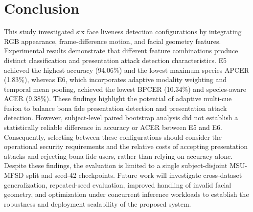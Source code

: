 \documentclass[a4paper,conference]{IEEEtran}
\begin{document}
\section{Conclusion}
This study investigated six face liveness detection configurations by integrating RGB appearance, frame-difference motion, and facial geometry features. Experimental results demonstrate that different feature combinations produce distinct classification and presentation attack detection characteristics. E5 achieved the highest accuracy (94.06\%) and the lowest maximum species APCER (1.83\%), whereas E6, which incorporates adaptive modality weighting and temporal mean pooling, achieved the lowest BPCER (10.34\%) and species-aware ACER (9.38\%). These findings highlight the potential of adaptive multi-cue fusion to balance bona fide presentation detection and presentation attack detection. However, subject-level paired bootstrap analysis did not establish a statistically reliable difference in accuracy or ACER between E5 and E6. Consequently, selecting between these configurations should consider the operational security requirements and the relative costs of accepting presentation attacks and rejecting bona fide users, rather than relying on accuracy alone. Despite these findings, the evaluation is limited to a single subject-disjoint MSU-MFSD split and seed-42 checkpoints. Future work will investigate cross-dataset generalization, repeated-seed evaluation, improved handling of invalid facial geometry, and optimization under concurrent inference workloads to establish the robustness and deployment scalability of the proposed system.
\end{document}
